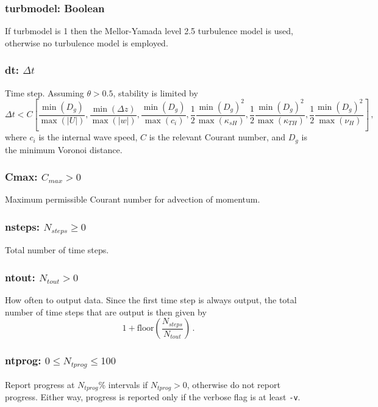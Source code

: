 \documentclass[12pt,oneside]{article}
\begin{document}
\subsubsection{turbmodel: Boolean}

If turbmodel is 1 then the Mellor-Yamada level 2.5 turbulence model is used, otherwise
no turbulence model is employed.  

\subsubsection{dt: $\Delta t$}

Time step. Assuming $\theta>0.5$, stability is limited by
\[
\Delta t < C\left[\frac{\min(D_g)}{\max(|U|)},\frac{\min(\Delta z)}{\max(|w|)},
\frac{\min(D_g)}{\max(c_i)},
\frac{1}{2}\frac{\min(D_g)^2}{\max(\kappa_{sH})},
\frac{1}{2}\frac{\min(D_g)^2}{\max(\kappa_{TH})},
\frac{1}{2}\frac{\min(D_g)^2}{\max(\nu_{H})}
\right]\,,
\]
where $c_i$ is the internal wave speed, $C$ is the relevant Courant number, and $D_g$
is the minimum Voronoi distance.

\subsubsection{Cmax: $C_{max}>0$}

Maximum permissible Courant number for advection of momentum.  

\subsubsection{nsteps: $N_{steps}\ge 0$}

Total number of time steps. 


\subsubsection{ntout: $N_{tout}> 0$}

How often to output data.  Since the first time step is always output, 
the total number of time steps that are output is then given
by
\[
1+\mbox{floor}\left(\frac{N_{steps}}{N_{tout}}\right)\,.
\]


\subsubsection{ntprog: $0\le N_{tprog}\le 100$}

Report progress at $N_{tprog}$\% intervals if $N_{tprog}>0$, otherwise do not report
progress.  Either way, progress is reported only if the verbose flag is at least \verb+-v+.
\end{document}
